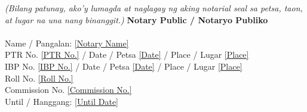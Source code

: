 \documentclass[a4paper,12pt]{article}
\begin{document}
\textit{(Bilang patunay, ako'y lumagda at naglagay ng aking notarial seal sa petsa, taon, at lugar na una nang binanggit.)}
\vspace{0.5cm}
\textbf{Notary Public / Notaryo Publiko} \\
\vspace{2cm} \hrulefill \\
Name / Pangalan: \underline{[Notary Name]} \\
PTR No. \underline{[PTR No.]} / Date / Petsa \underline{[Date]} / Place / Lugar \underline{[Place]} \\
IBP No. \underline{[IBP No.]} / Date / Petsa \underline{[Date]} / Place / Lugar \underline{[Place]} \\
Roll No. \underline{[Roll No.]} \\
Commission No. \underline{[Commission No.]} \\
Until / Hanggang: \underline{[Until Date]} \\
\label{LastPage}
\end{document}
